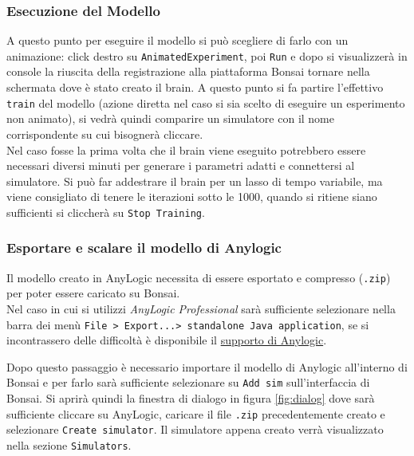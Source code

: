 \subsubsection{Esecuzione del Modello}
A questo punto per eseguire il modello si può scegliere di farlo con un animazione: click destro su \texttt{AnimatedExperiment}, poi \texttt{Run} e dopo si visualizzerà in console la riuscita della registrazione alla piattaforma Bonsai tornare nella schermata dove è stato creato il brain. 
A questo punto si fa partire l'effettivo \texttt{train} del modello (azione diretta nel caso si sia scelto di eseguire un esperimento non animato), si vedrà quindi comparire un simulatore con il nome corrispondente su cui bisognerà cliccare.
\\ Nel caso fosse la prima volta che il brain viene eseguito potrebbero essere necessari diversi minuti per generare i parametri adatti e connettersi al simulatore. Si può far addestrare il brain per un lasso di tempo variabile, ma viene consigliato di tenere le iterazioni sotto le 1000, quando si ritiene siano sufficienti si cliccherà su \texttt{Stop Training}.

\subsubsection{Esportare e scalare il modello di Anylogic}
Il modello creato in AnyLogic necessita di essere esportato e compresso (\texttt{.zip}) per poter essere caricato su Bonsai. \\ Nel caso in cui si utilizzi \textit{AnyLogic Professional} sarà sufficiente selezionare nella barra dei menù \texttt{File > Export...> standalone Java application}, se si incontrassero delle difficoltà è disponibile il \href{https://anylogic.help}{supporto di Anylogic}.

Dopo questo passaggio è necessario importare il modello di Anylogic all'interno di Bonsai e per farlo sarà sufficiente selezionare su \texttt{Add sim} sull'interfaccia di Bonsai.
Si aprirà quindi la finestra di dialogo in figura \ref{fig:dialog} dove sarà sufficiente cliccare su AnyLogic, caricare il file \texttt{.zip} precedentemente creato e selezionare \texttt{Create simulator}. Il simulatore appena creato verrà visualizzato nella sezione \texttt{Simulators}.

